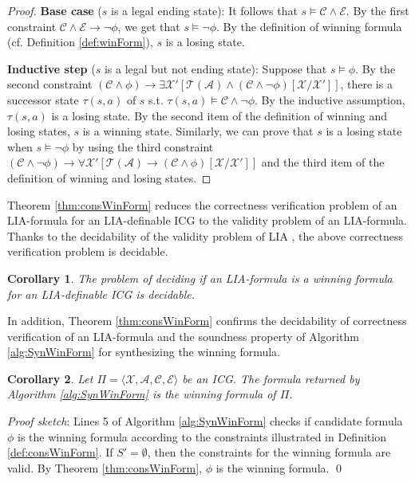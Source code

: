 \documentclass[review]{elsarticle}
\newcommand{\set}[1]{\{ #1 \}}
\newcommand{\tuple}[1]{\langle {#1} \rangle}
\newcommand{\statevar}{\mathcal{X}}
\newcommand{\winSet}{\mathcal{W}}
\newcommand{\act}{\mathcal{A}}
\newcommand{\trans}{\mathcal{T}}
\newcommand{\constraint}{\mathcal{C}}
\newcommand{\estate}{\mathcal{E}}
\newenvironment{proofsketch}{\textit{Proof sketch}:}{\qed}
\newtheorem{corollary}{Corollary}
\begin{document}
\begin{proof}
		\textbf{Base case} ($s$ is a legal ending state): 
		It follows that $s \models \constraint \land \estate$.	
		By the first constraint $\constraint \land \estate \rightarrow \neg \phi$, we get that $s \models \neg \phi$.
		By the definition of winning formula (cf. Definition \ref{def:winForm}), $s$ is a losing state.
		
		\textbf{Inductive step} ($s$ is a legal but not ending state):
		Suppose that $s \models \phi$.
		By the second constraint $(\constraint \land \phi) \rightarrow \exists \statevar' [\trans(\act) \land (\constraint \land \neg \phi)[\statevar/\statevar']]$, there is a successor state $\tau(s, a)$ of $s$ s.t. $\tau(s, a) \models \constraint \land \neg \phi$.
		By the inductive assumption, $\tau(s, a)$ is a losing state.
		By the second item of the definition of winning and losing states, $s$ is a winning state.
		Similarly, we can prove that $s$ is a losing state when $s \models \neg \phi$ by using the third constraint $(\constraint \land \neg \phi) \rightarrow \forall \statevar' [\trans(\act) \rightarrow (\constraint \land \phi)[\statevar/\statevar']]$ and the third item of the definition of winning and losing states.
%		
	\end{proof}
	
	Theorem \ref{thm:consWinForm} reduces the correctness verification problem of an LIA-formula for an LIA-definable ICG to the validity problem of an LIA-formula.
	Thanks to the decidability of the validity problem of LIA \cite{Pre1929}, the above correctness verification problem is decidable.
	\begin{corollary}
		The problem of deciding if an LIA-formula is a winning formula for an LIA-definable ICG is decidable.
	\end{corollary}
	
	
	In addition, Theorem \ref{thm:consWinForm} confirms the decidability of correctness verification of an LIA-formula and the soundness property of Algorithm \ref{alg:SynWinForm} for synthesizing the winning formula.
	\begin{corollary} \label{cor:winForm}
		Let $\Pi = \tuple{\statevar, \act, \constraint, \estate}$ be an ICG.
		The formula returned by Algorithm \ref{alg:SynWinForm} is the winning formula of $\Pi$.
	\end{corollary}	
	\begin{proofsketch}
		Lines 5 of Algorithm \ref{alg:SynWinForm} checks if candidate formula $\phi$ is the winning formula according to the constraints illustrated in Definition \ref{def:consWinForm}.
		If $S' = \emptyset$, then the constraints for the winning formula are valid.
		By Theorem \ref{thm:consWinForm}, $\phi$ is the winning formula.
	\end{proofsketch}
	
\end{document}
